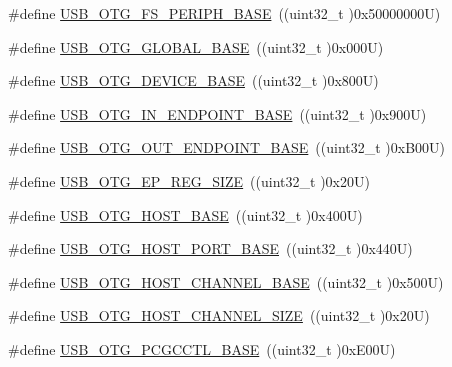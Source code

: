 \begin{DoxyCompactItemize}
\item 
\#define \hyperlink{group___peripheral__memory__map_gaa86d4c80849a74938924e73937b904e7}{U\+S\+B\+\_\+\+O\+T\+G\+\_\+\+F\+S\+\_\+\+P\+E\+R\+I\+P\+H\+\_\+\+B\+A\+SE}~((uint32\+\_\+t )0x50000000\+U)
\item 
\#define \hyperlink{group___peripheral__memory__map_ga044aa4388e72d9d47a03f387fb8926fb}{U\+S\+B\+\_\+\+O\+T\+G\+\_\+\+G\+L\+O\+B\+A\+L\+\_\+\+B\+A\+SE}~((uint32\+\_\+t )0x000\+U)
\item 
\#define \hyperlink{group___peripheral__memory__map_ga4d74a337597a77b1fca978202b519a18}{U\+S\+B\+\_\+\+O\+T\+G\+\_\+\+D\+E\+V\+I\+C\+E\+\_\+\+B\+A\+SE}~((uint32\+\_\+t )0x800\+U)
\item 
\#define \hyperlink{group___peripheral__memory__map_gad8f69041452615aeb3948600e3882246}{U\+S\+B\+\_\+\+O\+T\+G\+\_\+\+I\+N\+\_\+\+E\+N\+D\+P\+O\+I\+N\+T\+\_\+\+B\+A\+SE}~((uint32\+\_\+t )0x900\+U)
\item 
\#define \hyperlink{group___peripheral__memory__map_gaf0e972b8f028ecf44a652029efbd4642}{U\+S\+B\+\_\+\+O\+T\+G\+\_\+\+O\+U\+T\+\_\+\+E\+N\+D\+P\+O\+I\+N\+T\+\_\+\+B\+A\+SE}~((uint32\+\_\+t )0x\+B00\+U)
\item 
\#define \hyperlink{group___peripheral__memory__map_ga6fdb7429ad88e2d69440d6ecc4f4199e}{U\+S\+B\+\_\+\+O\+T\+G\+\_\+\+E\+P\+\_\+\+R\+E\+G\+\_\+\+S\+I\+ZE}~((uint32\+\_\+t )0x20\+U)
\item 
\#define \hyperlink{group___peripheral__memory__map_ga3bb2dd6c82eefd8587b6146ba36ae071}{U\+S\+B\+\_\+\+O\+T\+G\+\_\+\+H\+O\+S\+T\+\_\+\+B\+A\+SE}~((uint32\+\_\+t )0x400\+U)
\item 
\#define \hyperlink{group___peripheral__memory__map_ga42f433cb79ca69f09972e690fda6737a}{U\+S\+B\+\_\+\+O\+T\+G\+\_\+\+H\+O\+S\+T\+\_\+\+P\+O\+R\+T\+\_\+\+B\+A\+SE}~((uint32\+\_\+t )0x440\+U)
\item 
\#define \hyperlink{group___peripheral__memory__map_ga942c8c5241b80fbcf638fea0fa18bebd}{U\+S\+B\+\_\+\+O\+T\+G\+\_\+\+H\+O\+S\+T\+\_\+\+C\+H\+A\+N\+N\+E\+L\+\_\+\+B\+A\+SE}~((uint32\+\_\+t )0x500\+U)
\item 
\#define \hyperlink{group___peripheral__memory__map_ga266cb1dbb50faf447f9c15d2ee93a522}{U\+S\+B\+\_\+\+O\+T\+G\+\_\+\+H\+O\+S\+T\+\_\+\+C\+H\+A\+N\+N\+E\+L\+\_\+\+S\+I\+ZE}~((uint32\+\_\+t )0x20\+U)
\item 
\#define \hyperlink{group___peripheral__memory__map_gaa9766975aca084c257730879568bc7cf}{U\+S\+B\+\_\+\+O\+T\+G\+\_\+\+P\+C\+G\+C\+C\+T\+L\+\_\+\+B\+A\+SE}~((uint32\+\_\+t )0x\+E00\+U)
\item 

\end{DoxyCompactItemize}
